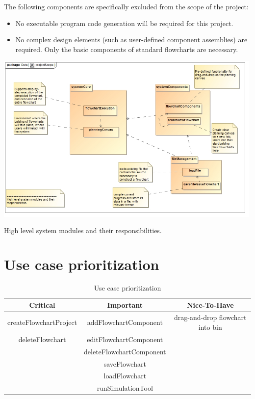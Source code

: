 \documentclass[11pt,a4paper,titlepage]{article}
\begin{document}
The following components are specifically excluded from the scope of the project:

\begin{itemize}
\item No executable program code generation will be required for this project.
\item No complex design elements (such as user-defined component assemblies) are required.
Only the basic components of standard flowcharts are necessary.\\

\end{itemize}

\includegraphics[width=500px]{projectScope.jpg}
\centerline{High level system modules and their responsibilities.}


\newpage	
\section{Use case prioritization}


\begin{table}[h!]  
    \caption{Use case prioritization}
    \label{tab:table1}
    \begin{tabular}{ccc}
      \toprule
      Critical & Important & Nice-To-Have\\
      \midrule	
      createFlowchartProject & addFlowchartComponent &  drag-and-drop flowchart into bin\\
      deleteFlowchart & editFlowchartComponent & \\
       & deleteFlowchartComponent & \\
       & saveFlowchart & \\
       & loadFlowchart & \\
       & runSimulationTool & \\
      \bottomrule
    \end{tabular}  
\end{table}
\end{document}
